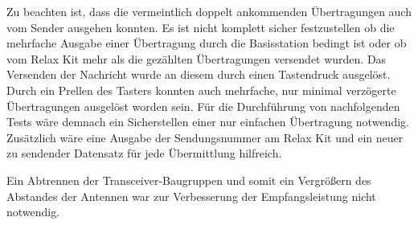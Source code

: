 Zu beachten ist, dass die vermeintlich doppelt ankommenden Übertragungen auch vom Sender ausgehen konnten. Es ist nicht komplett sicher festzustellen ob die mehrfache Ausgabe einer Übertragung durch die Basisstation  bedingt ist oder ob vom Relax Kit mehr als die gezählten Übertragungen versendet wurden. Das Versenden der Nachricht wurde an diesem durch einen Tastendruck ausgelöst.  Durch ein Prellen des Tasters konnten auch mehrfache, nur minimal verzögerte Übertragungen ausgelöst worden sein.
Für die Durchführung von nachfolgenden Tests wäre demnach ein Sicherstellen einer nur einfachen Übertragung notwendig. Zusätzlich wäre eine Ausgabe der Sendungsnummer am Relax Kit und ein neuer zu sendender Datensatz für jede Übermittlung hilfreich.

Ein Abtrennen der Transceiver-Baugruppen und somit ein Vergrößern des Abstandes der Antennen war zur Verbesserung der Empfangsleistung nicht notwendig.